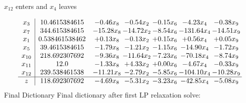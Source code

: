 \documentclass[8pt]{article}
\begin{document}
 $ x_{12} $ enters and $ x_{4} $ leaves 

 \[\begin{array}{c| c c@{\hskip 2pt} c@{\hskip 2pt} c@{\hskip 2pt} c@{\hskip 2pt} c@{\hskip 2pt} }
 x_{3}   &  10.4615384615 & -0.46 x_{8} & -0.54 x_{2} & -0.15 x_{6} & -4.23 x_{4} & -0.38 x_{9}\\
 x_{7}   &  344.615384615 & -15.28 x_{8} & -14.72 x_{2} & -8.54 x_{6} & -131.64 x_{4} & -14.51 x_{9}\\
 x_{1}   &  0.538461538462 & +  0.13 x_{8} & -0.13 x_{2} & +  0.15 x_{6} & +  0.56 x_{4} & +  0.05 x_{9}\\
 x_{5}   &  39.4615384615 & -1.79 x_{8} & -1.21 x_{2} & -1.15 x_{6} & -14.90 x_{4} & -1.72 x_{9}\\
 x_{10}   &  218.692307692 & -9.36 x_{8} & -11.64 x_{2} & -7.23 x_{6} & -70.18 x_{4} & -8.74 x_{9}\\
 x_{11}   &  12.0 & -1.33 x_{8} & +  4.33 x_{2} & +  0.00 x_{6} & -4.67 x_{4} & -0.33 x_{9}\\
 x_{12}   &  239.538461538 & -11.21 x_{8} & -2.79 x_{2} & -5.85 x_{6} & -104.10 x_{4} & -10.28 x_{9}\\
\hline
z    &  118.692307692 & -4.69 x_{8} & -5.31 x_{2} & -3.23 x_{6} & -42.85 x_{4} & -5.08 x_{9}\\
\end{array}\]
Final Dictionary
Final dictionary after first LP relaxation solve: 
\end{document}
